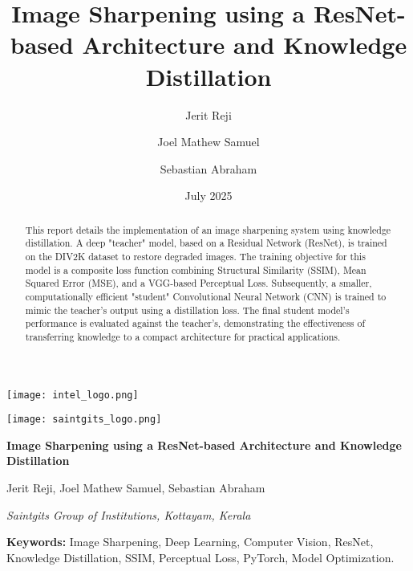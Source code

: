 \documentclass[12pt,a4paper]{article}
\title{Image Sharpening using a ResNet-based Architecture and Knowledge Distillation}
\author[1]{Jerit Reji}
\author[1]{Joel Mathew Samuel}
\author[1]{Sebastian Abraham}
\affil[1]{Saintgits Group of Institutions, Kottayam, Kerala}
\date{July 2025}
\begin{document}
\begin{titlepage}
    \thispagestyle{firstpage}
    
    \begin{minipage}{0.5\textwidth}
        \flushleft \texttt{[image: intel\_logo.png]}
    \end{minipage}%
    \begin{minipage}{0.5\textwidth}
        \flushright \texttt{[image: saintgits\_logo.png]}
    \end{minipage}
    
    \vfill 
    \centering
    {\Huge\bfseries Image Sharpening using a ResNet-based Architecture and Knowledge Distillation \par}
    \vspace{1.5cm} 
    {\Large Jerit Reji, Joel Mathew Samuel, Sebastian Abraham \par}
    \vspace{0.5cm}
    {\large \textit{Saintgits Group of Institutions, Kottayam, Kerala}\par}
    \vfill 
    
\end{titlepage}

\restoregeometry
\pagestyle{fancy} 

\begin{abstract}
\noindent This report details the implementation of an image sharpening system using knowledge distillation. A deep "teacher" model, based on a Residual Network (ResNet), is trained on the DIV2K dataset to restore degraded images. The training objective for this model is a composite loss function combining Structural Similarity (SSIM), Mean Squared Error (MSE), and a VGG-based Perceptual Loss. Subsequently, a smaller, computationally efficient "student" Convolutional Neural Network (CNN) is trained to mimic the teacher's output using a distillation loss. The final student model's performance is evaluated against the teacher's, demonstrating the effectiveness of transferring knowledge to a compact architecture for practical applications.
\end{abstract}

\vspace{0.5cm}
\textbf{Keywords:} Image Sharpening, Deep Learning, Computer Vision, ResNet, Knowledge Distillation, SSIM, Perceptual Loss, PyTorch, Model Optimization.
\vspace{1cm}
\end{document}
